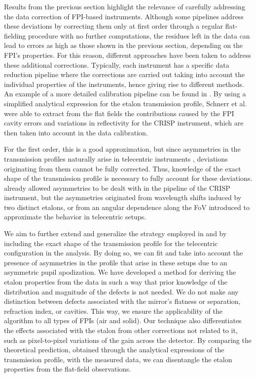Results from the previous section highlight the relevance of carefully addressing the data correction of FPI-based instruments. Although some pipelines address these deviations by correcting them only at first order through a regular flat-fielding procedure with no further computations, the residues left in the data can lead to errors as high as those shown in the previous section, depending on the FPI's properties. For this reason, different approaches have been taken to address these additional corrections. Typically, each instrument has a specific data reduction pipeline where the corrections are carried out taking into account the individual properties of the instruments, hence giving rise to different methods. An example of a more detailed calibration pipeline can be found in \cite{crisp-method}. By using a simplified analytical expression for the etalon transmission profile, Schnerr et al. were able to extract from the flat fields the contributions caused by the FPI cavity errors and variations in reflectivity for the CRISP instrument, which are then taken into account in the data calibration.

For the first order, this is a good approximation, but since asymmetries in the transmission profiles naturally arise in telecentric instruments \citep{franI}, deviations originating from them cannot be fully corrected. Thus, knowledge of the exact shape of the transmission profile is necessary to fully account for these deviations. \cite{schamer_method} already allowed asymmetries to be dealt with in the pipeline of the CRISP instrument, but the asymmetries originated from wavelength shifts induced by two distinct etalons, or from an angular dependence along the FoV introduced to approximate the behavior in telecentric setups.  

We aim to further extend and generalize the strategy employed in \cite{crisp-method} and \cite{schamer_method} by including the exact shape of the transmission profile for the telecentric configuration in the analysis. By doing so, we can fit and take into account the presence of asymmetries in the profile that arise in these setups due to an asymmetric pupil apodization. We have developed a method for deriving the etalon properties from the data in such a way that prior knowledge of the distribution and magnitude of the defects is not needed. We do not make any distinction between defects associated with the mirror's flatness or separation, refraction index, or cavities. This way, we ensure the applicability of the algorithm to all types of FPIs (air and solid). Our technique also differentiates the effects associated with the etalon from other corrections not related to it, such as pixel-to-pixel variations of the gain across the detector. By comparing the theoretical prediction, obtained through the analytical expressions of the transmission profile, with the measured data, we can disentangle the etalon properties from the flat-field observations. 

